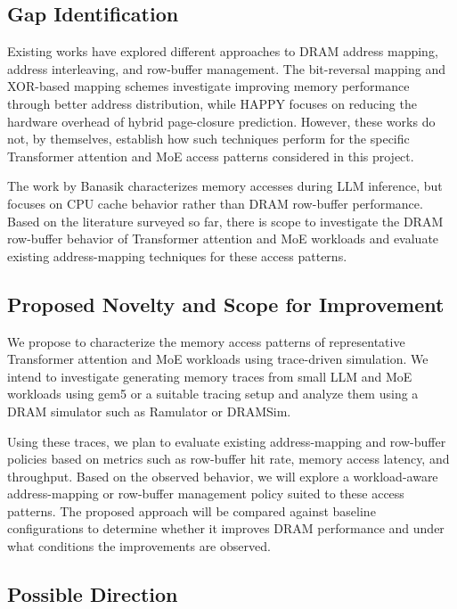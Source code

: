 \documentclass{article}
\begin{document}
\subsection{Gap Identification}

Existing works have explored different approaches to DRAM address mapping, address interleaving, and row-buffer management. The bit-reversal mapping \cite{shao2005bit} and XOR-based mapping schemes \cite{rotaru2026mathematical} investigate improving memory performance through better address distribution, while HAPPY \cite{ghasempour2016happy} focuses on reducing the hardware overhead of hybrid page-closure prediction. However, these works do not, by themselves, establish how such techniques perform for the specific Transformer attention and MoE access patterns considered in this project.

The work by Banasik \cite{banasik2025memoryaccesscharacterizationlarge} characterizes memory accesses during LLM inference, but focuses on CPU cache behavior rather than DRAM row-buffer performance. Based on the literature surveyed so far, there is scope to investigate the DRAM row-buffer behavior of Transformer attention and MoE workloads and evaluate existing address-mapping techniques for these access patterns.

\subsection{Proposed Novelty and Scope for Improvement}

We propose to characterize the memory access patterns of representative Transformer attention and MoE workloads using trace-driven simulation. We intend to investigate generating memory traces from small LLM and MoE workloads using gem5 or a suitable tracing setup and analyze them using a DRAM simulator such as Ramulator or DRAMSim.

Using these traces, we plan to evaluate existing address-mapping and row-buffer policies based on metrics such as row-buffer hit rate, memory access latency, and throughput. Based on the observed behavior, we will explore a workload-aware address-mapping or row-buffer management policy suited to these access patterns. The proposed approach will be compared against baseline configurations to determine whether it improves DRAM performance and under what conditions the improvements are observed.
\subsection{Possible Direction}
\end{document}
